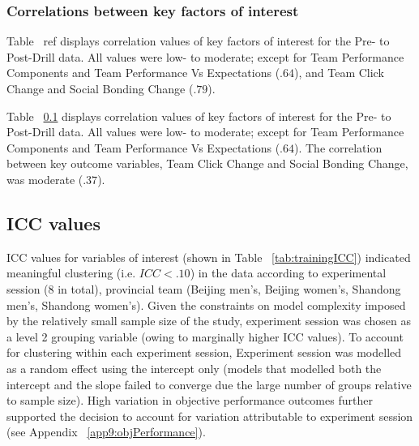 \subsubsection{Correlations between key factors of interest}
Table ~ref{} displays correlation values of key factors of interest for the Pre- to Post-Drill data.  All values were low- to moderate; except for Team Performance Components and Team Performance Vs Expectations ($.64$), and Team Click Change and Social Bonding Change ($.79$).



Table ~\ref{} displays correlation values of key factors of interest for the Pre- to Post-Drill data.  All values were low- to moderate; except for Team Performance Components and Team Performance Vs Expectations ($.64$).  The correlation between key outcome variables, Team Click Change and Social Bonding Change, was moderate ($.37$).




\subsection{ICC values}



ICC values for variables of interest (shown in Table ~\ref{tab:trainingICC}) indicated meaningful clustering (i.e. $ICC <.10$) in the data according to experimental session (8 in total), provincial team (Beijing men's, Beijing women's, Shandong men's, Shandong women's).  Given the constraints on model complexity imposed by the relatively small sample size of the study, experiment session was chosen as a level 2 grouping variable (owing to marginally higher ICC values).  To account for clustering within each experiment session, Experiment session was modelled as a random effect using the intercept only (models that modelled both the intercept and the slope failed to converge due the large number of groups relative to sample size).  High variation in objective performance outcomes further supported the decision to account for variation attributable to experiment session (see Appendix ~\ref{app9:objPerformance}).





